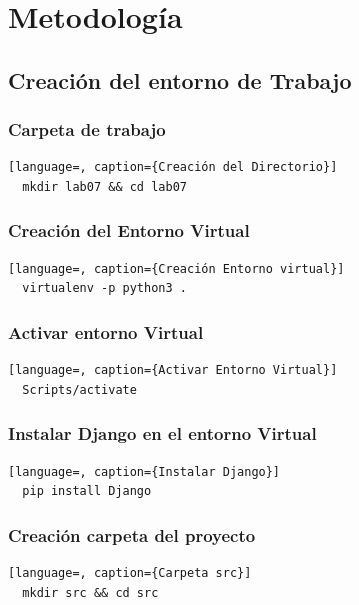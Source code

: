 \documentclass{article}
\begin{document}

  \section{Metodología}


  \subsection{Creación del entorno de Trabajo}
  

  \subsubsection{Carpeta de trabajo}
  \begin{lstlisting}[language=, caption={Creación del Directorio}]
  mkdir lab07 && cd lab07
  \end{lstlisting}
  

  \subsubsection{Creación del Entorno Virtual}
  \begin{lstlisting}[language=, caption={Creación Entorno virtual}]
  virtualenv -p python3 .
  \end{lstlisting}
  

  \subsubsection{Activar entorno Virtual}
  \begin{lstlisting}[language=, caption={Activar Entorno Virtual}]
  Scripts/activate
  \end{lstlisting}
  

  \subsubsection{Instalar Django en el entorno Virtual}
  \begin{lstlisting}[language=, caption={Instalar Django}]
  pip install Django
  \end{lstlisting}
  

  \subsubsection{Creación carpeta del proyecto}
  \begin{lstlisting}[language=, caption={Carpeta src}]
  mkdir src && cd src
  \end{lstlisting}
  
\end{document}
